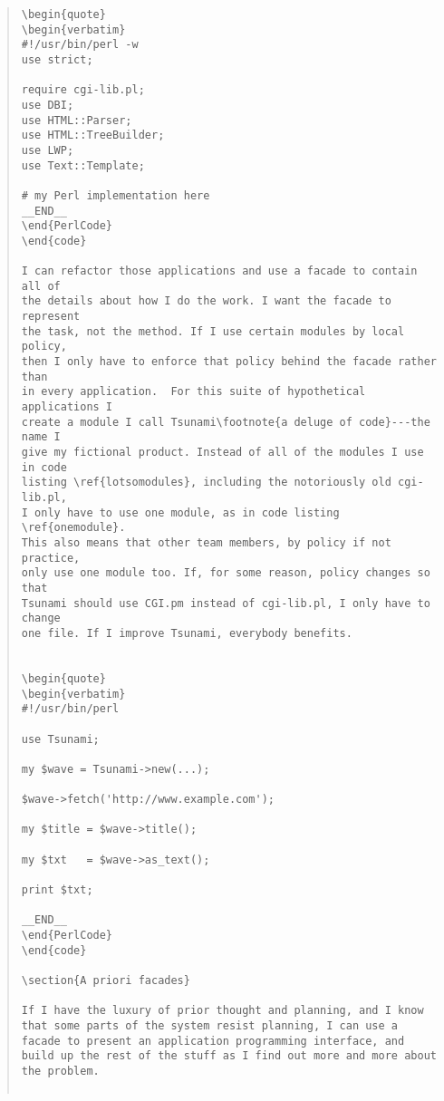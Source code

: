 \begin{quote}
\begin{verbatim}
\begin{quote}
\begin{verbatim}
#!/usr/bin/perl -w
use strict;

require cgi-lib.pl;
use DBI;
use HTML::Parser;
use HTML::TreeBuilder;
use LWP;
use Text::Template;

# my Perl implementation here
__END__
\end{PerlCode}
\end{code}

I can refactor those applications and use a facade to contain all of
the details about how I do the work. I want the facade to represent
the task, not the method. If I use certain modules by local policy,
then I only have to enforce that policy behind the facade rather than
in every application.  For this suite of hypothetical applications I
create a module I call Tsunami\footnote{a deluge of code}---the name I
give my fictional product. Instead of all of the modules I use in code
listing \ref{lotsomodules}, including the notoriously old cgi-lib.pl,
I only have to use one module, as in code listing \ref{onemodule}. 
This also means that other team members, by policy if not practice,
only use one module too. If, for some reason, policy changes so that
Tsunami should use CGI.pm instead of cgi-lib.pl, I only have to change
one file. If I improve Tsunami, everybody benefits.


\begin{quote}
\begin{verbatim}
#!/usr/bin/perl

use Tsunami;

my $wave = Tsunami->new(...);

$wave->fetch('http://www.example.com');

my $title = $wave->title();

my $txt   = $wave->as_text();

print $txt;

__END__
\end{PerlCode}
\end{code}

\section{A priori facades}

If I have the luxury of prior thought and planning, and I know
that some parts of the system resist planning, I can use a 
facade to present an application programming interface, and
build up the rest of the stuff as I find out more and more about
the problem.


\end{verbatim}
\end{quote}
